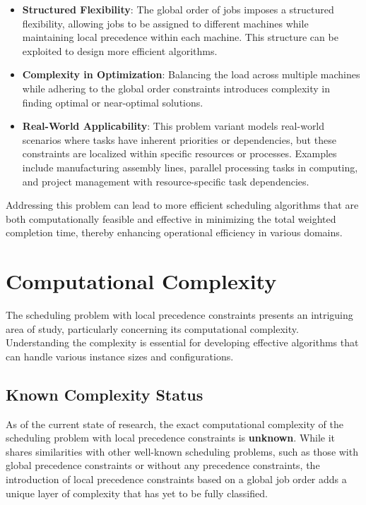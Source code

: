 \begin{itemize}
    \item \textbf{Structured Flexibility}: The global order of jobs imposes a structured flexibility, allowing jobs to be assigned to different machines while maintaining local precedence within each machine. This structure can be exploited to design more efficient algorithms.

    \item \textbf{Complexity in Optimization}: Balancing the load across multiple machines while adhering to the global order constraints introduces complexity in finding optimal or near-optimal solutions.

    \item \textbf{Real-World Applicability}: This problem variant models real-world scenarios where tasks have inherent priorities or dependencies, but these constraints are localized within specific resources or processes. Examples include manufacturing assembly lines, parallel processing tasks in computing, and project management with resource-specific task dependencies.
\end{itemize}

Addressing this problem can lead to more efficient scheduling algorithms that are both computationally feasible and effective in minimizing the total weighted completion time, thereby enhancing operational efficiency in various domains.


\section{Computational Complexity}

The scheduling problem with local precedence constraints presents an intriguing area of study, particularly concerning its computational complexity. Understanding the complexity is essential for developing effective algorithms that can handle various instance sizes and configurations.

\subsection{Known Complexity Status}

As of the current state of research, the exact computational complexity of the scheduling problem with local precedence constraints is \textbf{unknown}. While it shares similarities with other well-known scheduling problems, such as those with global precedence constraints or without any precedence constraints, the introduction of local precedence constraints based on a global job order adds a unique layer of complexity that has yet to be fully classified.

